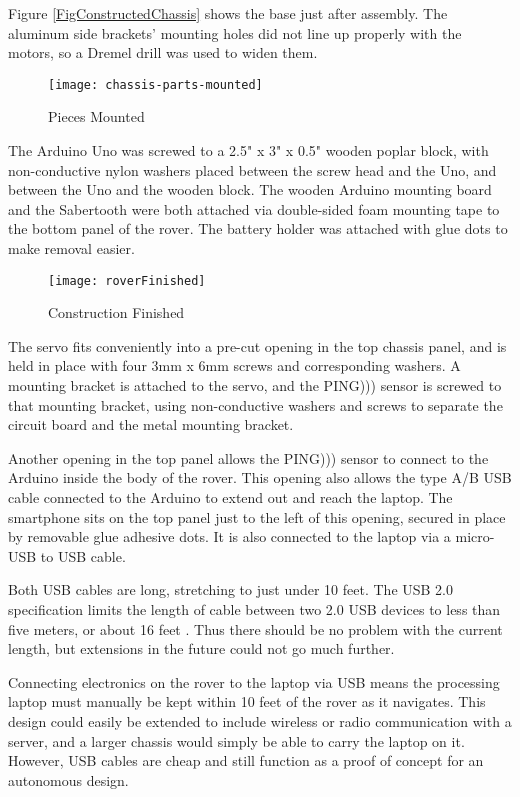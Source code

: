 Figure \ref{FigConstructedChassis} shows the base just after assembly. The aluminum side brackets' mounting holes did not line up properly with the motors, so a Dremel drill was used to widen them.

\begin{wrapfigure}{l}{0.5\textwidth}
	\caption{Pieces Mounted}
	\centering
	\texttt{[image: chassis-parts-mounted]}
	\label{FigChassisParts}
\end{wrapfigure}

The Arduino Uno was screwed to a 2.5" x 3" x 0.5" wooden poplar block, with non-conductive nylon washers placed between the screw head and the Uno, and between the Uno and the wooden block. The wooden Arduino mounting board and the Sabertooth were both attached via double-sided foam mounting tape to the bottom panel of the rover. The battery holder was attached with glue dots to make removal easier.

\begin{wrapfigure}{r}{0.5\textwidth}
	\caption{Construction Finished}
	\centering
	\texttt{[image: roverFinished]}
	\label{FigRoverFinished}
\end{wrapfigure}

The servo fits conveniently into a pre-cut opening in the top chassis panel, and is held in place with four 3mm x 6mm screws and corresponding washers. A mounting bracket is attached to the servo, and the PING))) sensor is screwed to that mounting bracket, using non-conductive washers and screws to separate the circuit board and the metal mounting bracket.

Another opening in the top panel allows the PING))) sensor to connect to the Arduino inside the body of the rover. This opening also allows the type A/B USB cable connected to the Arduino to extend out and reach the laptop. The smartphone sits on the top panel just to the left of this opening, secured in place by removable glue adhesive dots. It is also connected to the laptop via a micro-USB to USB cable.

Both USB cables are long, stretching to just under 10 feet. The USB 2.0 specification limits the length of cable between two 2.0 USB devices to less than five meters, or about 16 feet \cite{usbForum}. Thus there should be no problem with the current length, but extensions in the future could not go much further. 

Connecting electronics on the rover to the laptop via USB means the processing laptop must manually be kept within 10 feet of the rover as it navigates. This design could easily be extended to include wireless or radio communication with a server, and a larger chassis would simply be able to carry the laptop on it. However, USB cables are cheap and still function as a proof of concept for an autonomous design.

